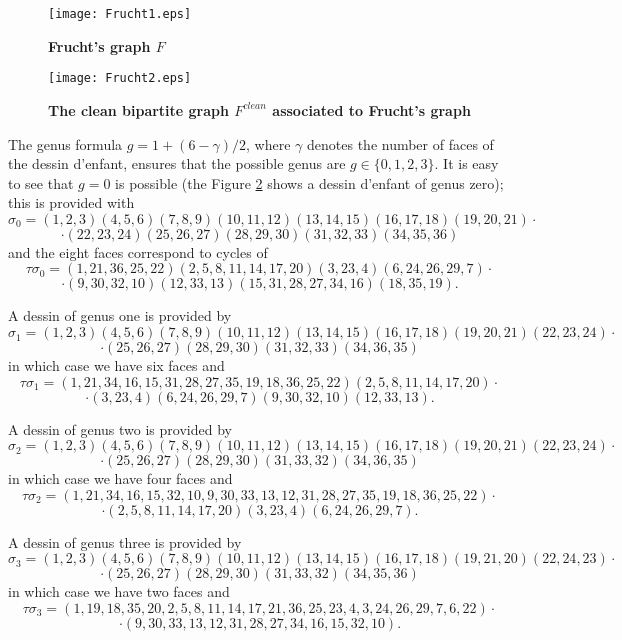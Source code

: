 \documentclass[12pt]{amsart}
\theoremstyle{remark}
\begin{document}
\begin{figure}[htbp]
\begin{center}
\texttt{[image: Frucht1.eps]}
\caption{{\bf Frucht's graph $F$}}
\label{FigFrucht1}
\end{center}
\end{figure}

\begin{figure}[htbp]
\begin{center}
\texttt{[image: Frucht2.eps]}
\caption{{\bf The clean bipartite graph $F^{clean}$ associated to Frucht's graph}}
\label{FigFrucht2}
\end{center}
\end{figure}

The genus formula $g=1+(6-\gamma)/2$, where $\gamma$ denotes the number of faces of the dessin d'enfant, ensures that the possible genus are $g \in \{0,1,2,3\}$.
It is easy to see that $g=0$ is possible (the Figure \ref{FigFrucht2} shows a dessin d'enfant of genus zero); this is provided with
$$\sigma_{0}=(1,2,3)(4,5,6)(7,8,9)(10,11,12)(13,14,15)(16,17,18)(19,20,21)\cdot$$
$$\cdot(22,23,24)(25,26,27)(28,29,30)(31,32,33)(34,35,36)$$ and the eight faces correspond to cycles of 
$$\tau\sigma_{0}=(1,21,36,25,22)(2,5,8,11,14,17,20)(3,23,4)(6,24,26,29,7)\cdot$$
$$\cdot(9,30,32,10)(12,33,13)(15,31,28,27,34,16)(18,35,19).$$

A dessin of genus one is provided by $$\sigma_{1}=(1,2,3)(4,5,6)(7,8,9)(10,11,12)(13,14,15)(16,17,18)(19,20,21)(22,23,24)\cdot$$ $$\cdot(25,26,27)(28,29,30)(31,32,33)(34,36,35)$$  in which case we have six faces and
$$\tau\sigma_{1}=(1,21,34,16,15,31,28,27,35,19,18,36,25,22)(2,5,8,11,14,17,20)\cdot$$
$$\cdot(3,23,4)(6,24,26,29,7)(9,30,32,10)(12,33,13).$$

A dessin of genus two is provided by $$\sigma_{2}=(1,2,3)(4,5,6)(7,8,9)(10,11,12)(13,14,15)(16,17,18)(19,20,21)(22,23,24)\cdot$$
$$\cdot(25,26,27)(28,29,30)(31,33,32)(34,36,35)$$  in which case we have four faces and
$$\tau\sigma_{2}=(1,21,34,16,15,32,10,9,30,33,13,12,31,28,27,35,19,18,36,25,22)\cdot$$
$$\cdot(2,5,8,11,14,17,20)(3,23,4)(6,24,26,29,7).$$

A dessin of genus three is provided by $$\sigma_{3}=(1,2,3)(4,5,6)(7,8,9)(10,11,12)(13,14,15)(16,17,18)(19,21,20)(22,24,23)\cdot$$
$$\cdot (25,26,27)(28,29,30)(31,33,32)(34,35,36)$$ in which case we have two faces and
$$\tau\sigma_{3}=(1,19,18,35,20,2,5,8,11,14,17,21,36,25,23,4,3,24,26,29,7,6,22)\cdot$$
$$\cdot (9,30,33,13,12,31,28,27,34,16,15,32,10).$$
\end{document}
